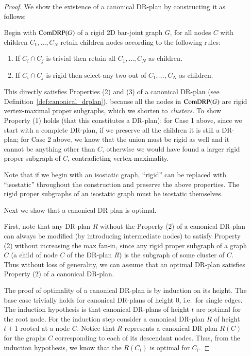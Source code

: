 \begin{proof}
We show the existence of a canonical DR-plan by constructing it as follows:

Begin with $\text{ComDRP}(G)$ of a rigid 2D bar-joint graph $G$, for all nodes $C$ with children $C_1,\ldots,C_N$  retain children nodes according to the following rules:
\begin{enumerate}
   \item If $C_i \cap C_j$ is trivial then retain all $C_1,\ldots,C_N$ as children.
   \item If $C_i \cap C_j$ is rigid then select any two out of $C_1,\ldots,C_N$ as children.
\end{enumerate}

This directly satisfies Properties (2) and (3) of a canonical DR-plan (see Definition~\ref{def:canonical_drplan}), because all the nodes in $\text{ComDRP}(G)$ are rigid vertex-maximal proper subgraphs,  which we shorten to {\em clusters}.  To show Property (1) holds (that this constitutes a DR-plan):
for Case 1 above,  since we start with a complete DR-plan, if we preserve all the children it is still a DR-plan; for Case 2 above, we know that the union must be rigid as well and it cannot be anything other than $C$, otherwise we would have found a larger rigid proper subgraph of $C$, contradicting vertex-maximality.

Note that if we begin with an isostatic graph, ``rigid'' can be replaced with ``isostatic'' throughout the construction and preserve the above properties. The rigid proper subgraphs of an isostatic graph must be isostatic themselves.

Next we show that a canonical DR-plan is optimal.

First, note  that any  DR-plan $R$ without the Property (2) of a canonical DR-plan can always be modified (by introducing intermediate nodes) to satisfy Property (2) without  increasing the max fan-in, since any rigid proper subgraph of a graph $C$ (a child of node $C$ of the DR-plan $R$)
is the subgraph of some cluster of $C$.
Thus without loss of generality, we can assume that an optimal DR-plan satisfies Property (2) of a canonical DR-plan.

The proof of optimality of a canonical DR-plan is by induction on its height.  The base case trivially holds for canonical DR-plans of height 0, i.e.\ for single edges. The induction hypothesis is that canonical DR-plans of height $t$ are optimal for the root node.
For the induction step consider a canonical DR-plan $R$ of  height $t+1$ rooted at a node $C$.
Notice that $R$ represents a canonical DR-plan $R(C)$ for the graphs $C$ corresponding to each of its  descendant nodes.
Thus, from the induction hypothesis, we know that the $R(C_i)$ is optimal for $C_i$.


\end{proof}
